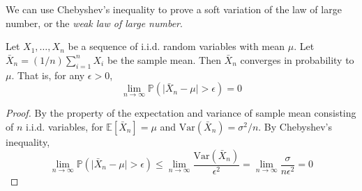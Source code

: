 We can use Chebyshev's inequality to prove a soft variation of the law of large number, or the \textit{weak law of large number}. 
\begin{theorem}
    Let $X_{1},\dots,X_{n}$ be a sequence of i.i.d. random variables with mean $\mu$. Let $\bar{X}_{n}=(1/n)\sum_{i=1}^{n}X_{i}$ be the sample mean. Then $\bar{X}_{n}$ converges in probability to $\mu$. That is, for any $\epsilon>0$, 
    \begin{equation}
        \lim_{n\to\infty}\mathbb{P}\left(\lvert \bar{X}_{n}-\mu\rvert > \epsilon\right)=0
    \end{equation}
\end{theorem}
\begin{proof}
    By the property of the expectation and variance of sample mean consisting of $n$ i.i.d. variables, for $\mathbb{E}[\bar{X}_{n}]=\mu$ and $\mathrm{Var}(\bar{X}_{n})=\sigma^{2}/n$. By Chebyshev's inequality, 
    \begin{equation}
        \lim_{n\to\infty} \mathbb{P}\left(\lvert \bar{X}_{n}-\mu\rvert > \epsilon\right) \leq \lim_{n\to \infty} \frac{\mathrm{Var}(\bar{X}_{n})}{\epsilon^{2}} = \lim_{n\to\infty} \frac{\sigma}{n\epsilon^{2}} = 0
    \end{equation}
\end{proof}
